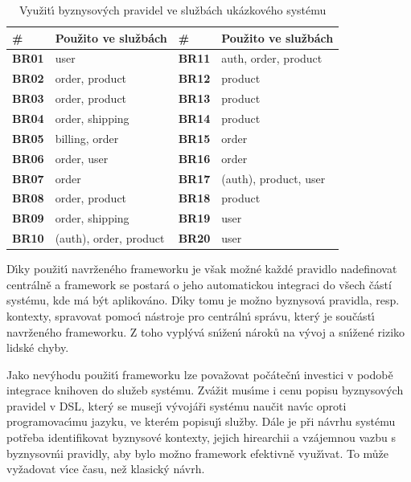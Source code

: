 \begin{table}
    \centering
    \begin{tabularx}{\textwidth}{ l X | l X }
        \hline
        \textbf{\#} & \textbf{Použito ve službách} & \textbf{\#} & \textbf{Použito ve službách} \\ \hline \hline
        \textbf{BR01} & user & \textbf{BR11} & auth, order, product \\
        \textbf{BR02} & order, product & \textbf{BR12} & product \\
        \textbf{BR03} & order, product & \textbf{BR13} & product \\
        \textbf{BR04} & order, shipping & \textbf{BR14} & product \\
        \textbf{BR05} & billing, order & \textbf{BR15} & order \\
        \textbf{BR06} & order, user & \textbf{BR16} & order \\
        \textbf{BR07} & order & \textbf{BR17} & (auth), product, user \\
        \textbf{BR08} & order, product & \textbf{BR18} & product \\
        \textbf{BR09} & order, shipping & \textbf{BR19} & user \\
        \textbf{BR10} & (auth), order, product & \textbf{BR20} & user \\
        \hline
    \end{tabularx}
    \caption{Využit\'{\i} byznysov\'ych pravidel ve službách ukázkového systému}
    \label{tbl:duplication}
\end{table}

D\'{\i}ky použit\'{\i} navrženého frameworku je však možné každé pravidlo nadefinovat centrálně
a framework se postará o jeho automatickou integraci do všech částí systému, kde má být aplikováno.
D\'{\i}ky tomu je možno byznysová pravidla, resp. kontexty, spravovat pomoc\'{\i} nástroje pro
centráln\'{\i} správu, kter\'y je součást\'{\i} navrženého frameworku. Z toho vypl\'yvá
sn\'{\i}žen\'{\i} nároků na v\'yvoj a sn\'{\i}žené riziko lidské chyby.

Jako nev\'yhodu použit\'{\i} frameworku lze považovat počátečn\'{\i} investici v
podobě integrace knihoven do služeb systému. Zvážit mus\'{\i}me i cenu popisu byznysov\'ych pravidel
v \gls{DSL}, kter\'y se musej\'{\i} v\'yvojáři systému naučit nav\'{\i}c oproti programovac\'{\i}mu jazyku,
ve kterém popisuj\'{\i} služby. Dále je při návrhu systému potřeba identifikovat byznysové kontexty, jejich
hirearchii a vzájemnou vazbu s byznysov\'mi pravidly, aby bylo možno framework efektivně využ\'{\i}vat.
To může vyžadovat v\'{\i}ce času, než klasick\'y návrh.

